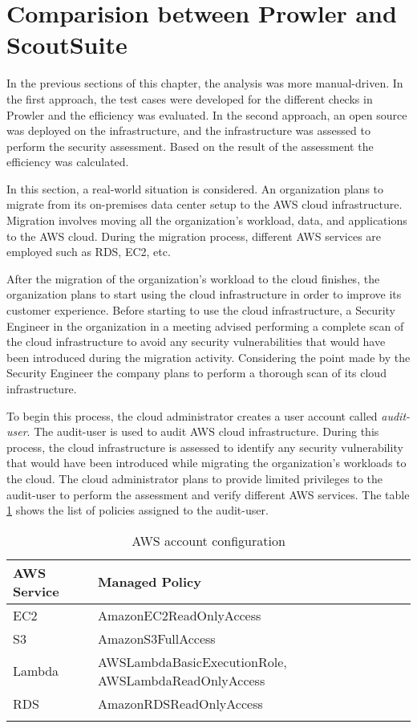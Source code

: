 \section{Comparision between Prowler and ScoutSuite}

\par In the previous sections of this chapter, the analysis was more manual-driven.
In the first approach, the test cases were developed for the different checks in Prowler and the efficiency was evaluated.
In the second approach, an open source was deployed on the infrastructure, and the infrastructure was assessed to perform the security assessment.
Based on the result of the assessment the efficiency was calculated.
\\
\par In this section, a real-world situation is considered.
An organization plans to migrate from its on-premises data center setup to the AWS cloud infrastructure.
Migration involves moving all the organization’s workload, data, and applications to the AWS cloud.
During the migration process, different AWS services are employed such as RDS, EC2, etc.
\\
\par After the migration of the organization's workload
to the cloud finishes, the organization plans to start using the cloud infrastructure in order to improve its customer experience.
Before starting to use the cloud infrastructure, a Security Engineer in the organization in a meeting advised performing a complete scan of the cloud infrastructure to avoid any security vulnerabilities that would have been introduced during the migration activity.
Considering the point made by the Security Engineer the company plans to perform a thorough scan of its cloud infrastructure.
\\
\par To begin this process, the cloud administrator creates a user account called \textit{audit-user}.
The audit-user is used to audit AWS cloud infrastructure.
During this process, the cloud infrastructure is assessed to identify any security vulnerability that would have been introduced while migrating the organization’s workloads to the cloud.
The cloud administrator plans to provide limited privileges to the audit-user to perform the assessment and verify different AWS services.
The table \ref{tab:accountconfiguration} shows the list
of policies assigned to the audit-user.
\\
\begin{longtable}{|p{6cm}|p{8cm}|}
    \hline
    \textbf{AWS Service} & \textbf{Managed Policy}\\
    \hline
    EC2 & AmazonEC2ReadOnlyAccess \\
    \hline
    S3 & AmazonS3FullAccess \\
    \hline
    Lambda & AWSLambdaBasicExecutionRole,
    AWSLambdaReadOnlyAccess \\
    \hline
    RDS & AmazonRDSReadOnlyAccess \\
    \hline
    \caption{AWS account configuration}
    \label{tab:accountconfiguration}
\end{longtable}



